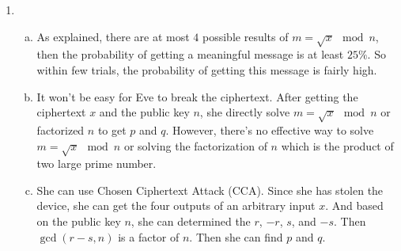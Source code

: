 \documentclass[11pt,a4paper]{article}
\begin{document}
\begin{enumerate}
    \item
    \begin{enumerate}[a)]
        \item As explained, there are at most $4$ possible results of $m = \sqrt{x} \mod n$, then the probability of getting a meaningful message is at least $25\%$. So within few trials, the probability of getting this message is fairly high.

        \item It won't be easy for Eve to break the ciphertext. After getting the ciphertext $x$ and the public key $n$, she directly solve $m = \sqrt{x} \mod n$ or factorized $n$ to get $p$ and $q$. However, there's no effective way to solve $m = \sqrt{x} \mod n$ or solving the factorization of $n$ which is the product of two large prime number.

        \item She can use Chosen Ciphertext Attack (CCA). Since she has stolen the device, she can get the four outputs of an arbitrary input $x$. And based on the public key $n$, she can determined the $r$, $-r$, $s$, and $-s$. Then $\gcd(r-s, n)$ is a factor of $n$. Then she can find $p$ and $q$.
    \end{enumerate}

\end{enumerate}
\end{document}
